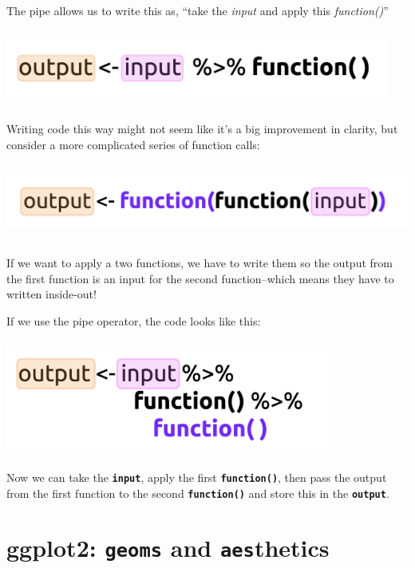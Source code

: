 \documentclass[letterpaper,12pt,twoside,]{pinp}
\begin{document}
The pipe allows us to write this as, ``take the \emph{input} and apply
this \emph{function()}''

\begin{center}\includegraphics[width=5in,height=1in]{../img/pipe-args-02} \end{center}

Writing code this way might not seem like it's a big improvement in
clarity, but consider a more complicated series of function calls:

\begin{center}\includegraphics[width=5.7in,height=1in]{../img/pipe-args-03} \end{center}

If we want to apply a two functions, we have to write them so the output
from the first function is an input for the second function--which means
they have to written inside-out!

If we use the pipe operator, the code looks like this:

\begin{center}\includegraphics[width=4.2in,height=1.5in]{../img/pipe-args-04} \end{center}

Now we can take the \textbf{\texttt{input}}, apply the first
\textbf{\texttt{function()}}, then pass the output from the first
function to the second \textbf{\texttt{function()}} and store this in
the \textbf{\texttt{output}}.

\hypertarget{ggplot2-geoms-and-aesthetics}{%
\section{\texorpdfstring{ggplot2: \texttt{geoms} and
\texttt{aes}thetics}{ggplot2: geoms and aesthetics}}\label{ggplot2-geoms-and-aesthetics}}
\end{document}
